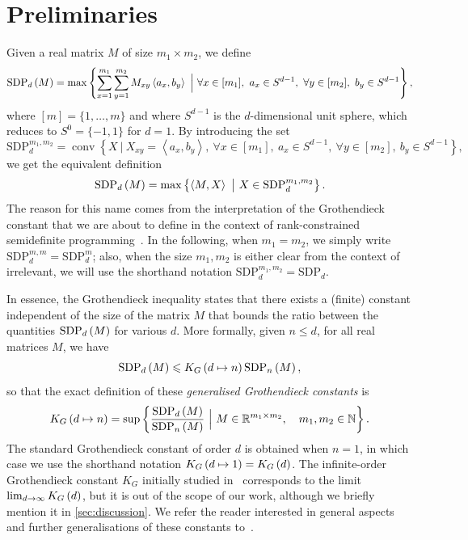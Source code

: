 \documentclass[10pt,aps,notitlepage,onecolumn,pra,superscriptaddress]{revtex4-1}
\DeclareMathOperator{\conv}{conv}
\renewcommand{\leq}{\leqslant}
\newcommand\cut[2]{\mathrm{SDP}_{#1}^{#2}}
\newcommand{\innp}[2]{\left\langle{#1},{#2}\right\rangle}
\newcommand\KG[2]{K_G\left({#1}\ifx#2\empty\else\mapsto\fi{#2}\right)}
\newcommand{\NN}{\mathbb{N}}
\newcommand{\RR}{\mathbb{R}}
\newcommand\sdp[2]{\mathrm{SDP}_{#1}\ifx#2\empty\else\left({#2}\right)\fi}
\begin{document}
\section{Preliminaries}
\label{sec:preliminaries}

Given a real matrix $M$ of size $m_1\times m_2$, we define
\begin{equation}
  \sdp{d}{M}=\max\left\{\sum_{x=1}^{m_1}\sum_{y=1}^{m_2} M_{xy}\innp{a_x}{b_y}~\Big|~\forall x\in[m_1],~a_x\in S^{d-1},~\forall y\in[m_2],~b_y\in S^{d-1}\right\},
  \label{eqn:SDPdM}
\end{equation}
where $[m]=\{1,\ldots,m\}$ and where $S^{d-1}$ is the $d$-dimensional unit sphere, which reduces to $S^0=\{-1,1\}$ for $d=1$.
By introducing the set
\begin{equation}
  \cut{d}{m_1,m_2}=\conv\left\{X~\big|~X_{xy}=\innp{a_x}{b_y},~\forall x\in[m_1],~a_x\in S^{d-1},~\forall y\in[m_2],~b_y\in S^{d-1}\right\},
  \label{eqn:cut}
\end{equation}
we get the equivalent definition
\begin{equation}
  \sdp{d}{M}=\max\left\{\innp{M}{X}~\big|~X\in\cut{d}{m_1,m_2}\right\}.
  \label{eqn:SDPdM_cut}
\end{equation}
The reason for this name comes from the interpretation of the Grothendieck constant that we are about to define in the context of rank-constrained semidefinite programming~\cite{BOV14}.
In the following, when $m_1=m_2$, we simply write $\cut{d}{m,m}=\cut{d}{m}$; also, when the size $m_1,m_2$ is either clear from the context of irrelevant, we will use the shorthand notation $\cut{d}{m_1,m_2}=\cut{d}{}$.

In essence, the Grothendieck inequality states that there exists a (finite) constant independent of the size of the matrix $M$ that bounds the ratio between the quantities $\sdp{d}{M}$ for various $d$.
More formally, given $n\leq d$, for all real matrices $M$, we have~\cite{Gro53}
\begin{equation}
  \sdp{d}{M}\leq\KG{d}{n}\sdp{n}{M},
  \label{eqn:Grothendieck}
\end{equation}
so that the exact definition of these \emph{generalised Grothendieck constants} is
\begin{equation}
  \KG{d}{n}=\sup\left\{\frac{\sdp{d}{M}}{\sdp{n}{M}}~\Big|~M\in\RR^{m_1\times m_2},\quad m_1,m_2\in\NN\right\}.
  \label{eqn:KGdn}
\end{equation}
The standard Grothendieck constant of order $d$ is obtained when $n=1$, in which case we use the shorthand notation $\KG{d}{1}=\KG{d}{}$.
The infinite-order Grothendieck constant $K_G$ initially studied in~\cite{Gro53} corresponds to the limit $\lim_{d\rightarrow\infty}\KG{d}{}$, but it is out of the scope of our work, although we briefly mention it in \cref{sec:discussion}.
We refer the reader interested in general aspects and further generalisations of these constants to~\cite{Bri11}.
\end{document}
